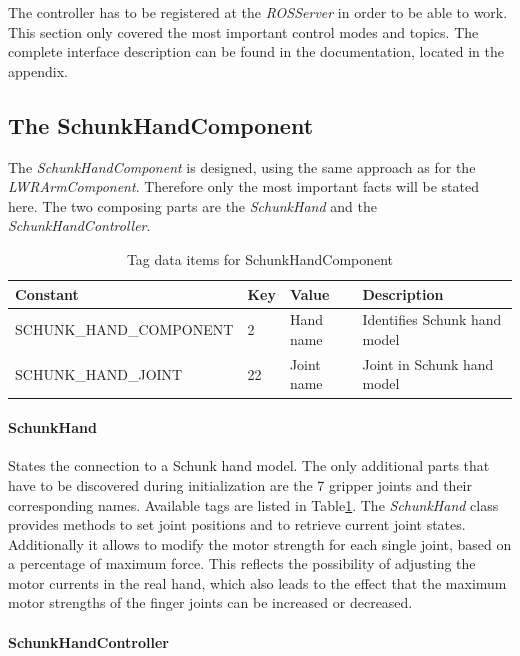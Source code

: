 The controller has to be registered at the \emph{ROSServer} in order to be able to work. This section only covered the most important control modes and topics. The complete interface description can be found in the documentation, located in the appendix.

\subsection{The SchunkHandComponent}

The \emph{SchunkHandComponent} is designed, using the same approach as for the \emph{LWRArmComponent}. Therefore only the most important facts will be stated here. The two composing parts are the \emph{SchunkHand} and the \emph{SchunkHandController}.
\begin{table}[h]
  \centering
  \begin{tabularx}{\textwidth}{|l|l|l|X|} \hline
	\textbf{Constant} & \textbf{Key} & \textbf{Value} & \textbf{Description} \\ \hline
	SCHUNK\_HAND\_COMPONENT & 2 & Hand name & Identifies Schunk hand model \\
	SCHUNK\_HAND\_JOINT & 22 & Joint name & Joint in Schunk hand model \\ \hline
  \end{tabularx}
  \caption{Tag data items for SchunkHandComponent}
  \label{fig:schunk_tags}
\end{table}

\paragraph{SchunkHand}

States the connection to a Schunk hand model. The only additional parts that have to be discovered during initialization are the 7 gripper joints and their corresponding names. Available tags are
listed in Table\ref{fig:schunk_tags}. The \emph{SchunkHand} class provides methods to set joint positions and to retrieve current joint states. Additionally it allows to modify the motor strength for each single joint, based on a percentage of maximum force. This reflects the possibility of adjusting the motor currents in the real hand, which also leads to the effect that the maximum motor strengths of the finger joints can be increased or decreased.

\paragraph{SchunkHandController}

